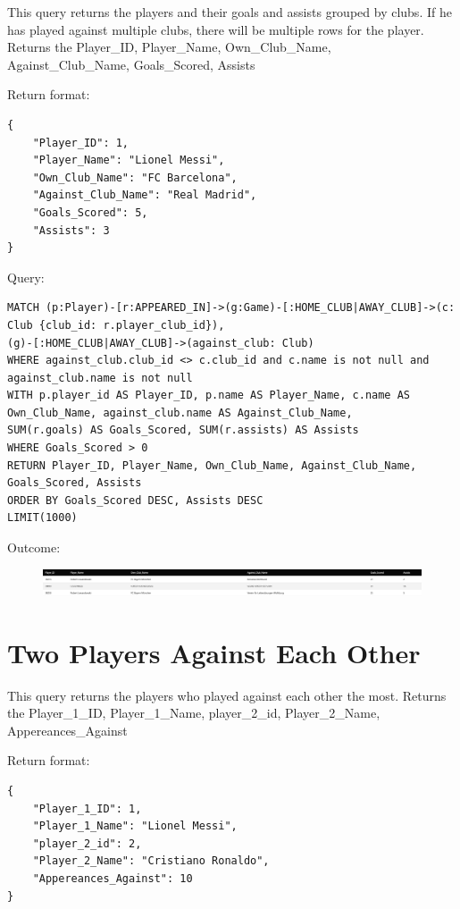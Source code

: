 \documentclass{Configuration_Files/PoliMi3i_thesis}
\begin{document}
This query returns the players and their goals and assists grouped by clubs.
If he has played against multiple clubs, there will be multiple rows for the player.
Returns the Player\_ID, Player\_Name, Own\_Club\_Name, Against\_Club\_Name, Goals\_Scored, Assists

Return format:
\begin{lstlisting}[style=json]
{
    "Player_ID": 1,
    "Player_Name": "Lionel Messi",
    "Own_Club_Name": "FC Barcelona",
    "Against_Club_Name": "Real Madrid",
    "Goals_Scored": 5,
    "Assists": 3
}
\end{lstlisting}


Query:

\begin{lstlisting}[language=Cypher]
MATCH (p:Player)-[r:APPEARED_IN]->(g:Game)-[:HOME_CLUB|AWAY_CLUB]->(c: Club {club_id: r.player_club_id}), 
(g)-[:HOME_CLUB|AWAY_CLUB]->(against_club: Club)
WHERE against_club.club_id <> c.club_id and c.name is not null and against_club.name is not null
WITH p.player_id AS Player_ID, p.name AS Player_Name, c.name AS Own_Club_Name, against_club.name AS Against_Club_Name,
SUM(r.goals) AS Goals_Scored, SUM(r.assists) AS Assists
WHERE Goals_Scored > 0
RETURN Player_ID, Player_Name, Own_Club_Name, Against_Club_Name, Goals_Scored, Assists
ORDER BY Goals_Scored DESC, Assists DESC
LIMIT(1000)
\end{lstlisting}


Outcome:

\begin{figure}[H]
    \centering
    \includegraphics[width=\linewidth]{Project Template/Images/query_output/q2.png}
\end{figure}



\section{Two Players Against Each Other}
This query returns the players who played against each other the most.
Returns the Player\_1\_ID, Player\_1\_Name, player\_2\_id, Player\_2\_Name, Appereances\_Against

Return format:
\begin{lstlisting}[style=json]
{
    "Player_1_ID": 1,
    "Player_1_Name": "Lionel Messi",
    "player_2_id": 2,
    "Player_2_Name": "Cristiano Ronaldo",
    "Appereances_Against": 10
}
\end{lstlisting}
\end{document}
